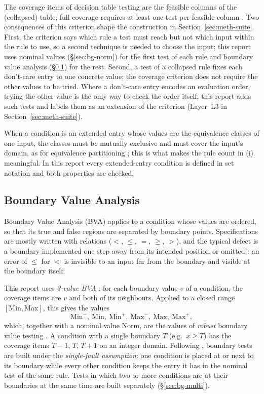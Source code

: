 \documentclass[11pt,a4paper]{article}
\newcommand{\Norm}{\mathrm{Norm}}
\begin{document}
The coverage items of decision table testing are the feasible columns of the
(collapsed) table; full coverage requires at least one test per feasible
column \cite[\S4.2.3]{istqb}. Two consequences of this criterion shape the
construction in Section~\ref{sec:meth-suite}. First, the criterion says which
rule a test must reach but not which input within the rule to use, so a
second technique is needed to choose the input; this report uses nominal
values (\S\ref{sec:bg-norm}) for the first test of each rule and boundary
value analysis (\S\ref{sec:bg-bva}) for the rest. Second, a test of a
collapsed rule fixes each don't-care entry to one concrete value; the
coverage criterion does not require the other values to be tried. Where a
don't-care entry encodes an evaluation order, trying the other value is the
only way to check the order itself; this report adds such tests and labels
them as an extension of the criterion (Layer~L3 in
Section~\ref{sec:meth-suite}).

When a condition is an extended entry whose values are the equivalence
classes of one input, the classes must be mutually exclusive and must cover
the input's domain, as for equivalence partitioning
\cite{myers2011,istqb}; this is what makes the rule count in (i) meaningful.
In this report every extended-entry condition is defined in set notation and
both properties are checked.
\subsection{Boundary Value Analysis}
\label{sec:bg-bva}

Boundary Value Analysis (BVA) \cite{myers2011,beizer1990,istqb} applies to a
condition whose values are ordered, so that its true and false regions are
separated by boundary points. Specifications are mostly written with
relations (\(<\), \(\le\), \(=\), \(\ge\), \(>\)), and the typical defect is a
boundary implemented one step away from its intended position or omitted
\cite[\S4.2.2]{istqb}: an error of \(\le\) for \(<\) is invisible to an input
far from the boundary and visible at the boundary itself.

This report uses \emph{3-value BVA} \cite[\S4.2.2]{istqb}: for each boundary
value \(v\) of a condition, the coverage items are \(v\) and both of its
neighbours. Applied to a closed range \([\mathrm{Min},\mathrm{Max}]\), this
gives the values
\[
\mathrm{Min}^-,\ \mathrm{Min},\ \mathrm{Min}^+,\ \mathrm{Max}^-,\ \mathrm{Max},\ \mathrm{Max}^+,
\]
which, together with a nominal value \(\Norm\), are the values of
\emph{robust} boundary value testing \cite[Ch.~5]{jorgensen2021}. A condition
with a single boundary \(T\) (e.g.\ \(x\ge T\)) has the coverage items
\(T-1\), \(T\), \(T+1\) on an integer domain. Following
\cite[Ch.~5]{jorgensen2021}, boundary tests are built under the
\emph{single-fault assumption}: one condition is placed at or next to its
boundary while every other condition keeps the entry it has in the nominal
test of the same rule. Tests in which two or more conditions are at their
boundaries at the same time are built separately (\S\ref{sec:bg-multi}).
\end{document}
